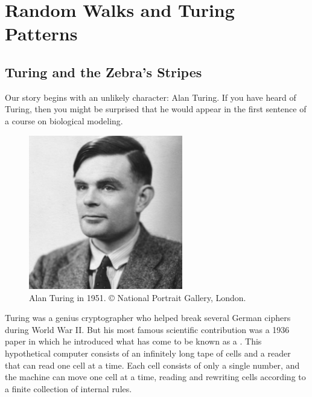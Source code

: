 \chapter[Random Walks and Turing Patterns]{Random Walks and Turing Patterns}
\label{chapter:turing}
\renewcommand{\chaptertitle}{Finding Motifs in Transcription Factor Networks}


\FloatBarrier

\section{Turing and the Zebra’s Stripes}
\label{sec:introduction}

Our story begins with an unlikely character: Alan Turing. If you have heard of Turing, then you might be surprised that he would appear in the first sentence of a course on biological modeling.

\begin{figure}[h]
\centering
\mySfFamily
\includegraphics[width = 0.6\textwidth]{../images/alan_turing_npg_cc.jpg}
\caption{Alan Turing in 1951. © National Portrait Gallery, London.}
\label{fig:alan_turing_npg_cc}
\end{figure}

Turing was a genius cryptographer who helped break several German ciphers during World War II. But his most famous scientific contribution was a 1936 paper in which he introduced what has come to be known as a . This hypothetical computer consists of an infinitely long tape of cells and a reader that can read one cell at a time. Each cell consists of only a single number, and the machine can move one cell at a time, reading and rewriting cells according to a finite collection of internal rules.

